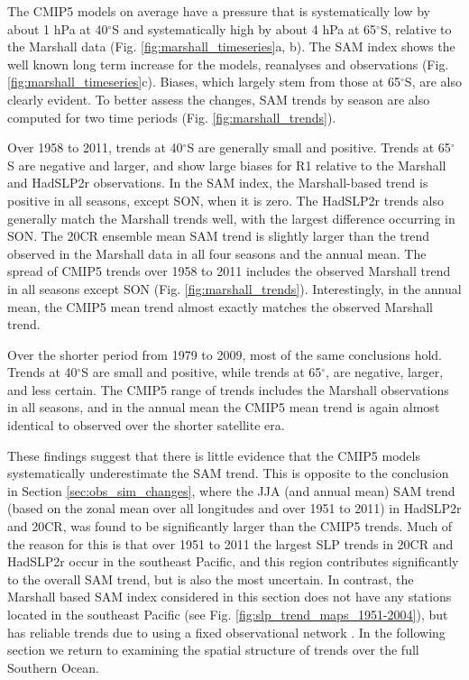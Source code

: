 \documentclass{ametsoc}
\begin{document}
The CMIP5 models on average have a pressure that is systematically low by about 1 hPa at 40$^{\circ}$S
and systematically high by about 4 hPa at 65$^{\circ}$S, relative to the Marshall data 
(Fig. \ref{fig:marshall_timeseries}a, b). The SAM index shows the well known long term increase for the 
models, reanalyses and observations (Fig. \ref{fig:marshall_timeseries}c). Biases, which largely stem 
from those at 65$^{\circ}$S, are also clearly evident. To better assess the changes, SAM trends by 
season are also computed for two time periods (Fig. \ref{fig:marshall_trends}). 

Over 1958 to 2011,
trends at 40$^{\circ}$S are generally small and positive. Trends at 65$^{\circ}$S are negative and
larger, and show large biases for R1 relative to the Marshall and HadSLP2r observations. In the SAM index, the Marshall-based trend is positive in all
seasons, except SON, when it is zero. The HadSLP2r trends also generally match the Marshall trends
well, with the largest difference occurring in SON. The 20CR ensemble mean SAM trend is slightly larger 
than the trend observed in the Marshall data in all
four seasons and the annual mean. The spread of CMIP5 trends over 1958 to 2011 includes 
the observed Marshall trend in all seasons except SON (Fig. \ref{fig:marshall_trends}). Interestingly, 
in the annual mean, the CMIP5 mean trend almost exactly matches the observed Marshall trend.

Over the shorter period from 1979 to 2009, most of the same conclusions 
hold. Trends at 40$^{\circ}$S are small and positive, while trends at 65$^{\circ}$, are negative, larger, 
and less certain. The CMIP5 range of trends includes the Marshall observations in all seasons, 
and in the annual mean the CMIP5 mean trend is again almost identical to observed over the shorter
satellite era. 

These findings suggest that there is little evidence that the CMIP5 models 
systematically  underestimate the SAM trend. This is opposite to the conclusion in 
Section \ref{sec:obs_sim_changes}, where the JJA (and annual mean) SAM trend (based on the zonal mean 
over all longitudes and over 1951 to 2011) in HadSLP2r and 20CR, was found to be significantly 
larger than the CMIP5 trends. Much of the reason for this is that over 1951 to 2011 the largest
SLP trends in 20CR and HadSLP2r occur in the southeast Pacific, and this region contributes
significantly to the overall SAM trend, but is also the most uncertain. In contrast, the 
Marshall based SAM index considered in this section does not have any stations located in the 
southeast Pacific (see Fig. \ref{fig:slp_trend_maps_1951-2004}), but has reliable trends due to using a fixed 
observational network \citep{Marshall_2003}. In the following section we return to examining the spatial structure of 
trends over the full Southern Ocean.
\end{document}
